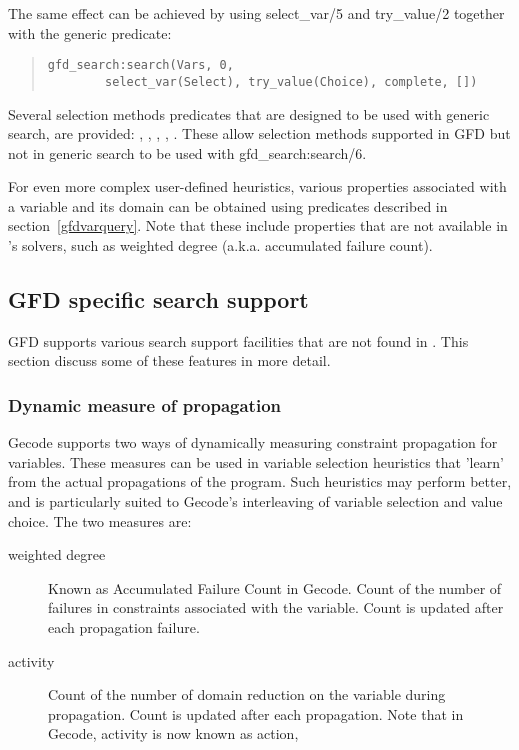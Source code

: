 The same effect can be achieved by using select_var/5 and try_value/2
together with the generic
predicate:
\begin{quote}
\begin{verbatim}
gfd_search:search(Vars, 0,
        select_var(Select), try_value(Choice), complete, [])
\end{verbatim}
\end{quote}
\begin{sloppypar}
Several selection methods predicates that are designed to be used with
generic search, are provided:
, , ,
, .
These allow selection methods supported in GFD but not in generic search
to be used with gfd_search:search/6.
\end{sloppypar}

For even more complex user-defined heuristics, various properties associated
with a variable and its domain can be obtained using predicates described
in section~\ref{gfdvarquery}. Note that these include properties that are not
available in
\eclipse's solvers, such as weighted degree (a.k.a. accumulated failure count).

\subsection{GFD specific search support\label{addsearch}}

GFD supports various search support facilities that are not found in 
\eclipse. This section discuss some of these features in more detail.

\subsubsection{Dynamic measure of propagation\label{dynmeasure}}

Gecode supports two ways of dynamically measuring constraint propagation for
variables. These measures can be used in variable selection heuristics 
that  'learn' from the actual propagations of the program. Such
heuristics may perform better, and is particularly suited to Gecode's
interleaving of variable selection and value choice. The two measures are:
\begin{description}
\item[weighted degree] Known as Accumulated Failure Count in Gecode. 
Count of the number of failures in
constraints associated with the variable. Count is updated after each
propagation failure.
\item[activity] Count of the number of domain
reduction on the variable during propagation. Count is updated after each
propagation. Note that in Gecode, activity is now known as action,
\end{description}

